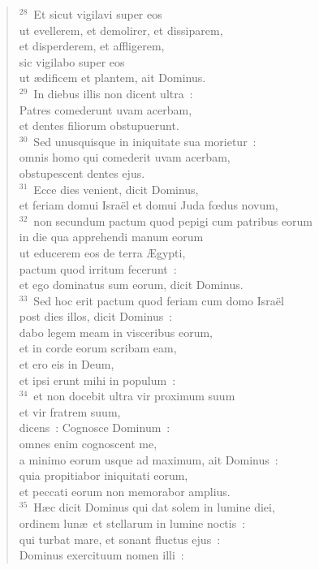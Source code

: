 \begin{verse}
${}^{28}$~Et sicut vigilavi super eos\\ ut evellerem, et demolirer, et dissiparem,\\ et disperderem, et affligerem,\\ sic vigilabo super eos\\ ut \ae dificem et plantem, ait Dominus.\\
${}^{29}$~In diebus illis non dicent ultra~:\\ Patres comederunt uvam acerbam,\\ et dentes filiorum obstupuerunt.\\
${}^{30}$~Sed unusquisque in iniquitate sua morietur~:\\ omnis homo qui comederit uvam acerbam,\\ obstupescent dentes ejus.\\
${}^{31}$~Ecce dies venient, dicit Dominus,\\ et feriam domui Isra\"el et domui Juda fœdus novum,\\
${}^{32}$~non secundum pactum quod pepigi cum patribus eorum\\ in die qua apprehendi manum eorum\\ ut educerem eos de terra \AE gypti,\\ pactum quod irritum fecerunt~:\\ et ego dominatus sum eorum, dicit Dominus.\\
${}^{33}$~Sed hoc erit pactum quod feriam cum domo Isra\"el\\ post dies illos, dicit Dominus~:\\ dabo legem meam in visceribus eorum,\\ et in corde eorum scribam eam,\\ et ero eis in Deum,\\ et ipsi erunt mihi in populum~:\\
${}^{34}$~et non docebit ultra vir proximum suum\\ et vir fratrem suum,\\ dicens~: Cognosce Dominum~:\\ omnes enim cognoscent me,\\ a minimo eorum usque ad maximum, ait Dominus~:\\ quia propitiabor iniquitati eorum,\\ et peccati eorum non memorabor amplius.\\
${}^{35}$~H\ae c dicit Dominus qui dat solem in lumine diei,\\ ordinem lun\ae\ et stellarum in lumine noctis~:\\ qui turbat mare, et sonant fluctus ejus~:\\ Dominus exercituum nomen illi~:\\

\end{verse}
